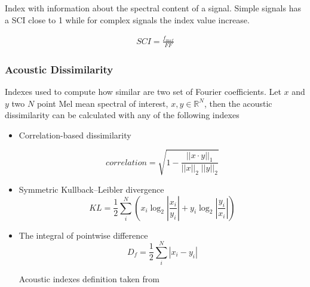 Index with information about the spectral content of a signal. Simple signals has a SCI close to 1 while for complex signals the index value increase.

\begin{gather}\label{eq_SCI}
    SCI = \frac{f_{msf}}{FF}
\end{gather}




\subsubsection{Acoustic Dissimilarity}

Indexes used to compute how similar are two set of Fourier coefficients. Let $x$ and $y$ two $N$ point Mel mean spectral of interest, $x,y\in \mathbb{R}^N$, then the acoustic dissimilarity can be calculated with any of the following indexes


\begin{itemize}
    \item Correlation-based dissimilarity
    
    \begin{equation}\label{correlation_eq}
        correlation = \sqrt{1-\frac{||x\cdot y||_1}{||x||_2 \;||y||_2}}
    \end{equation}
    
    \item Symmetric Kullback–Leibler divergence
    \begin{equation}\label{SKL_eq}
        KL = \frac{1}{2} \sum_i^N \left(x_i \log_2\left|\frac{x_i}{y_i}\right| + y_i \log_2\left|\frac{y_i}{x_i}\right|  \right)
    \end{equation}
    
    
    \item The integral of pointwise difference
    \begin{equation}\label{SKL_eq}
        D_f = \frac{1}{2} \sum_i^N |x_i-y_i| %
    \end{equation}
    
    Acoustic indexes definition taken from \cite{dissimilarity_acoustic_indices}
\end{itemize}

